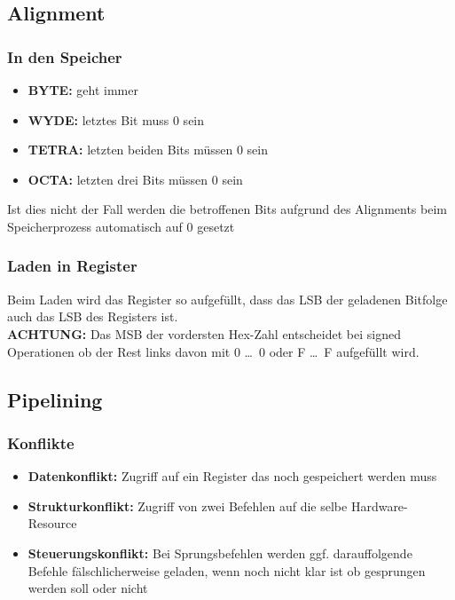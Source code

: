 \documentclass[german]{latex4ei/latex4ei_sheet}
\begin{document}
\subsection{Alignment}
\subsubsection{In den Speicher}
\begin{itemize}\itemsep0pt
\item \textbf{BYTE:} geht immer
\item \textbf{WYDE:} letztes Bit muss 0 sein 
\item \textbf{TETRA:} letzten beiden Bits müssen 0 sein 
\item \textbf{OCTA:} letzten drei Bits müssen 0 sein 
\end{itemize}
Ist dies nicht der Fall werden die betroffenen Bits aufgrund des Alignments beim Speicherprozess automatisch auf 0 gesetzt
\subsubsection{Laden in Register}
Beim Laden wird das Register so aufgefüllt, dass das LSB der geladenen Bitfolge auch das LSB des Registers ist. \\
\textbf{ACHTUNG:} Das MSB der vordersten Hex-Zahl entscheidet bei signed Operationen ob der Rest links davon mit 0 \dots \ 0 oder F \dots \ F aufgefüllt wird.
\subsection{Pipelining}
\subsubsection{Konflikte}
\begin{itemize}\itemsep0pt
\item \textbf{Datenkonflikt:} Zugriff auf ein Register das noch gespeichert werden muss
\item \textbf{Strukturkonflikt:} Zugriff von zwei Befehlen auf die selbe Hardware-Resource 
\item \textbf{Steuerungskonflikt:} Bei Sprungsbefehlen werden ggf. darauffolgende Befehle fälschlicherweise geladen, wenn noch nicht klar ist ob gesprungen werden soll oder nicht
\end{itemize}
\end{document}
